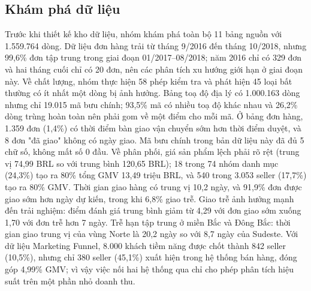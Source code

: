 \subsection{Khám phá dữ liệu}
Trước khi thiết kế kho dữ liệu, nhóm khám phá toàn bộ 11 bảng nguồn với 1.559.764 dòng. Dữ liệu đơn hàng trải từ tháng 9/2016 đến tháng 10/2018, nhưng 99,6\% đơn tập trung trong giai đoạn 01/2017–08/2018; năm 2016 chỉ có 329 đơn và hai tháng cuối chỉ có 20 đơn, nên các phân tích xu hướng giới hạn ở giai đoạn này. Về chất lượng, nhóm thực hiện 58 phép kiểm tra và phát hiện 45 loại bất thường có ít nhất một dòng bị ảnh hưởng. Bảng toạ độ địa lý có 1.000.163 dòng nhưng chỉ 19.015 mã bưu chính; 93,5\% mã có nhiều toạ độ khác nhau và 26,2\% dòng trùng hoàn toàn nên phải gom về một điểm cho mỗi mã. Ở bảng đơn hàng, 1.359 đơn (1,4\%) có thời điểm bàn giao vận chuyển sớm hơn thời điểm duyệt, và 8 đơn "đã giao" không có ngày giao. Mã bưu chính trong bản dữ liệu này đã đủ 5 chữ số, không mất số 0 đầu. Về phân phối, giá sản phẩm lệch phải rõ rệt (trung vị 74,99 BRL so với trung bình 120,65 BRL); 18 trong 74 nhóm danh mục (24,3\%) tạo ra 80\% tổng GMV 13,49 triệu BRL, và 540 trong 3.053 seller (17,7\%) tạo ra 80\% GMV. Thời gian giao hàng có trung vị 10,2 ngày, và 91,9\% đơn được giao sớm hơn ngày dự kiến, trong khi 6,8\% giao trễ. Giao trễ ảnh hưởng mạnh đến trải nghiệm: điểm đánh giá trung bình giảm từ 4,29 với đơn giao sớm xuống 1,70 với đơn trễ hơn 7 ngày. Trễ hạn tập trung ở miền Bắc và Đông Bắc: thời gian giao trung vị của vùng Norte là 20,2 ngày so với 8,7 ngày của Sudeste. Với dữ liệu Marketing Funnel, 8.000 khách tiềm năng được chốt thành 842 seller (10,5\%), nhưng chỉ 380 seller (45,1\%) xuất hiện trong hệ thống bán hàng, đóng góp 4,99\% GMV; vì vậy việc nối hai hệ thống qua  chỉ cho phép phân tích hiệu suất trên một phần nhỏ doanh thu.

